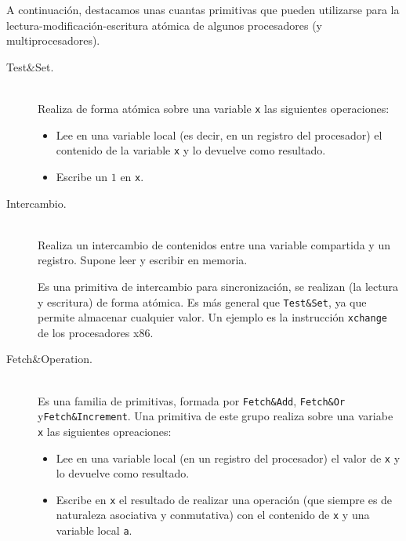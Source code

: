A continuación, destacamos unas cuantas primitivas que pueden utilizarse para la lectura-modificación-escritura atómica de algunos procesadores (y multiprocesadores).
\begin{description}
    \item [Test\&Set.]~\\
        Realiza de forma atómica sobre una variable \verb|x| las siguientes operaciones:
        \begin{itemize}
            \item Lee en una variable local (es decir, en un registro del procesador) el contenido de la variable \verb|x| y lo devuelve como resultado.
            \item Escribe un $1$ en \verb|x|.
        \end{itemize}
    \item [Intercambio.]~\\
        Realiza un intercambio de contenidos entre una variable compartida y un registro. Supone leer y escribir en memoria. 

        Es una primitiva de intercambio para sincronización, se realizan (la lectura y escritura) de forma atómica. Es más general que \verb|Test&Set|, ya que permite almacenar cualquier valor. Un ejemplo es la instrucción \verb|xchange| de los procesadores x86.
    \item [Fetch\&Operation.]~\\
        Es una familia de primitivas, formada por \verb|Fetch&Add|, \verb|Fetch&Or| y\newline \verb|Fetch&Increment|. Una primitiva de este grupo realiza sobre una variabe \verb|x| las siguientes opreaciones:
        \begin{itemize}
            \item Lee en una variable local (en un registro del procesador) el valor de \verb|x| y lo devuelve como resultado.
            \item Escribe en \verb|x| el resultado de realizar una operación (que siempre es de naturaleza asociativa y conmutativa) con el contenido de \verb|x| y una variable local \verb|a|.


\end{itemize}
\end{description}
